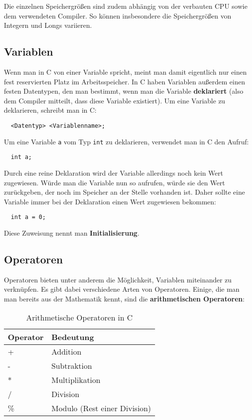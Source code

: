 \documentclass[11pt]{article}
\begin{document}
Die einzelnen Speichergrößen sind zudem abhängig von der verbauten CPU sowie dem verwendeten Compiler. So können
insbesondere die Speichergrößen von Integern und Longs variieren.

\subsection{Variablen}
Wenn man in C von einer Variable spricht, meint man damit eigentlich nur einen fest reservierten Platz im Arbeitsspeicher.
In C haben Variablen außerdem einen festen Datentypen, den man bestimmt, wenn man die Variable \textbf{deklariert} (also dem Compiler
mitteilt, dass diese Variable existiert). Um eine Variable zu deklarieren, schreibt man in C:
\begin{verbatim}
  <Datentyp> <Variablenname>;
\end{verbatim}

\begin{bsp}
  Um eine Variable \texttt{a} vom Typ \texttt{int} zu deklarieren, verwendet man in C den Aufruf:
  \begin{verbatim}
  int a;
  \end{verbatim}
\end{bsp}

Durch eine reine Deklaration wird der Variable allerdings noch kein Wert zugewiesen. Würde man die Variable nun so aufrufen,
würde sie den Wert zurückgeben, der noch im Speicher an der Stelle vorhanden ist. Daher sollte eine Variable immer
bei der Deklaration einen Wert zugewiesen bekommen:
\begin{verbatim}
  int a = 0;
\end{verbatim}

Diese Zuweisung nennt man \textbf{Initialisierung}.

\subsection{Operatoren}
Operatoren bieten unter anderem die Möglichkeit, Variablen miteinander zu verknüpfen. Es gibt dabei verschiedene Arten
von Operatoren. Einige, die man man bereits aus der Mathematik kennt, sind die \textbf{arithmetischen Operatoren}:
\begin{table}[h!]
  \centering
  \begin{tabular}{@{}ll@{}}
    \toprule
    Operator & Bedeutung                    \\ \midrule
    +        & Addition                     \\
    -        & Subtraktion                  \\
    *        & Multiplikation               \\
    /        & Division                     \\
    \%       & Modulo (Rest einer Division) \\ \bottomrule
  \end{tabular}
  \caption{Arithmetische Operatoren in C}
\end{table}
\end{document}

